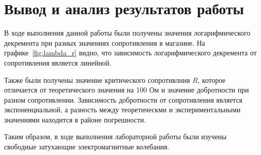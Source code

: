 \section{Вывод и анализ результатов работы}
В ходе выполнения данной работы были получены значения логарифмического
декремента при разных значениях сопротивления в магазине.
На графике~\ref{fig:lambda_r} видно, что зависимость логарифмического декремента
от сопротивления является линейной.

Также были получены значение критического сопротивлния \(R\), которое отличается
от теоретического значения на 100 Ом и значение добротности при разном сопротивлении.
Зависимость добротности от сопротивления является экспоненциальной, а 
разность между теоретическми и экспериментальными значениями находится в районе погрешности.

Таким образом, в ходе выполнения лабораторной работы были изучены свободные 
затухающие электромагнитные колебания.
